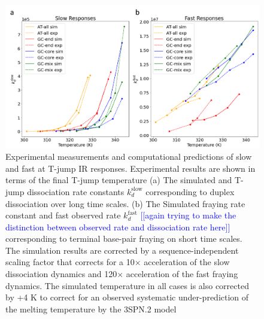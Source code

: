 \documentclass[journal=jpcbfk,manuscript=article]{achemso}
\newcommand*{\noteb}[1]{\textcolor{blue}{[[#1]]}}		%
\begin{document}
\begin{figure}[ht!]
	\begin{center}
        \includegraphics[width=\textwidth]{Fig1.pdf}
        \caption{Experimental measurements and computational predictions of slow and fast at T-jump IR responses. Experimental results are shown in terms of the final T-jump temperature (a) The simulated and T-jump dissociation rate constants $k_d^\mathrm{slow}$ corresponding to duplex dissociation over long time scales. (b) The Simulated fraying rate constant and fast observed rate $k_d^\mathrm{fast}$ \noteb{again trying to make the distinction between observed rate and dissociation rate here} corresponding to terminal base-pair fraying on short time scales. The simulation results are corrected by a sequence-independent scaling factor that corrects for a 10$\times$ acceleration of the slow dissociation dynamics and 120$\times$ acceleration of the fast fraying dynamics. The simulated temperature in all cases is also corrected by +4 K to correct for an observed systematic under-prediction of the melting temperature by the 3SPN.2 model}
        \label{fig:relaxation-comparison}
	\end{center}
\end{figure}
\end{document}
